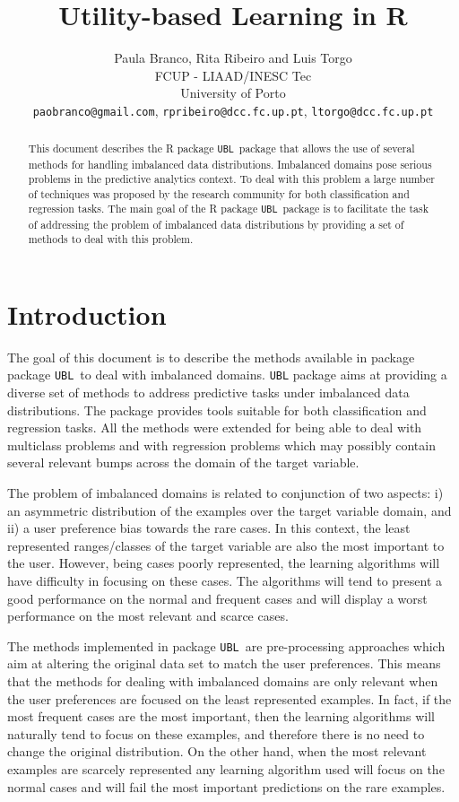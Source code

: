 \documentclass[10pt,a4paper]{article}\usepackage[]{graphicx}\usepackage[]{color}
\author{Paula Branco, Rita Ribeiro and Luis Torgo\\FCUP - LIAAD/INESC Tec\\University of Porto\\
  \texttt{paobranco@gmail.com}, \texttt{rpribeiro@dcc.fc.up.pt}, \texttt{ltorgo@dcc.fc.up.pt}}
\title{Utility-based Learning in R}
\newcommand{\UBL}{package \texttt{UBL}\ }
\begin{document}
\maketitle


\begin{abstract}
  
  This document describes the R \UBL package that allows the use of several methods for handling imbalanced data distributions. Imbalanced domains pose serious problems in the predictive analytics context. To deal with this problem a large number of techniques was proposed by the research community for both classification and regression tasks.
  The main goal of the R \UBL package is to facilitate the task of addressing the problem of imbalanced data distributions by providing a set of methods to deal with this problem. 
   
\end{abstract}

\section{Introduction}

The goal of this document is to describe the methods available in package \UBL to deal with imbalanced domains. \texttt{UBL} package aims at providing a diverse set of methods to address predictive tasks under imbalanced data distributions. The package provides tools suitable for both classification and regression tasks.
All the methods were extended for being able to deal with multiclass problems and with regression problems which may possibly contain several relevant bumps across the domain of the target variable.

The problem of imbalanced domains is related to conjunction of two aspects: i) an asymmetric distribution of the examples over the target variable domain, and ii) a user preference bias towards the rare cases. In this context, the least represented ranges/classes of the target variable are also the most important to the user. However, being cases poorly represented, the learning algorithms will have difficulty in focusing on these cases. The algorithms will tend to present a good performance on the normal and frequent cases and will display a worst performance on the most relevant and scarce cases.


The methods implemented in \UBL are pre-processing approaches which aim at altering the original data set to match the user preferences. This means that the methods for dealing with imbalanced domains are only relevant when the user preferences are focused on the least represented examples. In fact, if the most frequent cases are the most important, then the learning algorithms will naturally tend to focus on these examples, and therefore there is no need to change the original distribution. On the other hand, when the most relevant examples are scarcely represented any learning algorithm used will focus on the normal cases and will fail the most important predictions on the rare examples.
\end{document}
